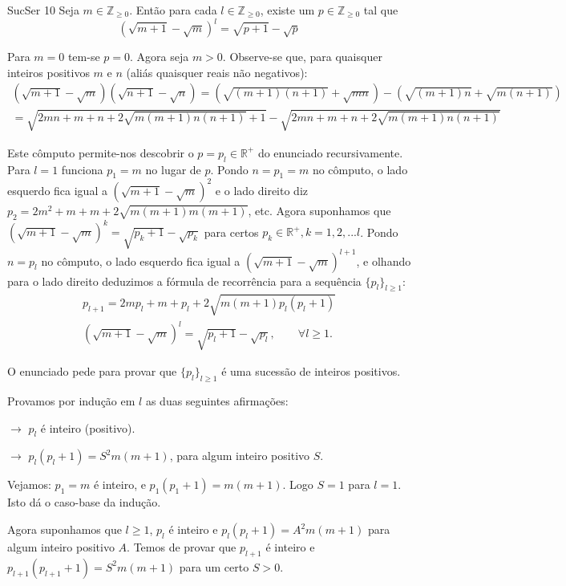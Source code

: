 \documentclass[repertorio-solutions-1.tex]{subfiles}
\begin{document}
\begin{problem}{SucSer 10}
Seja $m\in\mathbb{Z}_{\geq 0}$. Então para cada $l\in\mathbb{Z}_{\geq 0}$,
existe um $p\in\mathbb{Z}_{\geq 0}$ tal que
\begin{equation*}
(\sqrt{m+1}-\sqrt{m})^l=\sqrt{p+1}-\sqrt{p}
\end{equation*}
\end{problem}

\begin{solution}
Para $m=0$ tem-se $p=0$.
Agora seja $m>0$.
Observe-se que, para quaisquer inteiros positivos $m$ e $n$
(aliás quaisquer reais não negativos):
\begin{align*}
(\sqrt{m+1}-\sqrt{m})(\sqrt{n+1}-\sqrt{n})
=(\sqrt{(m+1)(n+1)}+\sqrt{mn})-(\sqrt{(m+1)n}+\sqrt{m(n+1)}) \\
=\sqrt{2mn+m+n+2\sqrt{m(m+1)n(n+1)}+1}-\sqrt{2mn+m+n+2\sqrt{m(m+1)n(n+1)}}
\end{align*}

Este cômputo permite-nos descobrir o $p=p_l\in\mathbb{R}^+$
do enunciado recursivamente.
Para $l=1$ funciona $p_1=m$ no lugar de $p$.
Pondo $n=p_1=m$ no cômputo, o lado esquerdo fica igual a
$(\sqrt{m+1}-\sqrt{m})^2$ e o lado direito diz
$p_2=2m^2+m+m+2\sqrt{m(m+1)m(m+1)}$, etc.
Agora suponhamos que $(\sqrt{m+1}-\sqrt{m})^k=\sqrt{p_k+1}-\sqrt{p_k}$
para certos $p_k\in\mathbb{R}^+, k=1,2,...l$.
Pondo $n=p_l$ no cômputo, o lado esquerdo fica igual a
$(\sqrt{m+1}-\sqrt{m})^{l+1}$, e olhando para o lado direito
deduzimos a fórmula de recorrência para a sequência $\{p_l\}_{l\geq 1}$:
\begin{align*}
p_{l+1}=2mp_l+m+p_l+2\sqrt{m(m+1)p_l(p_l+1)} \\
(\sqrt{m+1}-\sqrt{m})^l=\sqrt{p_l+1}-\sqrt{p_l},\qquad \forall l\geq 1.
\end{align*}

O enunciado pede para provar que $\{p_l\}_{l\geq 1}$
é uma sucessão de inteiros positivos.

Provamos por indução em $l$ as duas seguintes afirmações:

$\rightarrow$  $p_l$ é inteiro (positivo).

$\rightarrow$  $p_l(p_l+1)=S^2m(m+1)$, para algum inteiro positivo $S$.

Vejamos: $p_1=m$ é inteiro, e $p_1(p_1+1)=m(m+1)$. Logo $S=1$ para $l=1$.
Isto dá o caso-base da indução.

Agora suponhamos que $l\geq 1$, $p_l$ é inteiro e $p_l(p_l+1)=A^2m(m+1)$
para algum inteiro positivo $A$.
Temos de provar que $p_{l+1}$ é inteiro e $p_{l+1}(p_{l+1}+1)=S^2m(m+1)$
para um certo $S>0$.


\end{solution}
\end{document}
